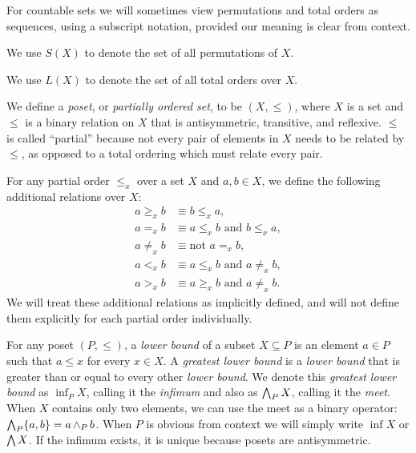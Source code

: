 	For countable sets we will sometimes view permutations and total orders as sequences, using a subscript notation, provided our meaning is clear from context.

	\begin{definition}
		We use $S(X)$ to denote the set of all permutations of $X$.
	\end{definition}

	\begin{definition}
		We use $L(X)$ to denote the set of all total orders over $X$.
	\end{definition}

	\begin{definition}
		We define a \emph{poset}, or \emph{partially ordered set}, to be $(X, \le)$, where $X$ is a set and $\le$ is a binary relation on $X$ that is antisymmetric, transitive, and reflexive. $\le$ is called ``partial'' because not every pair of elements in $X$ needs to be related by $\le$, as opposed to a total ordering which must relate every pair.
	\end{definition}

	\begin{definition}
		For any partial order $\le_x$ over a set $X$ and $a, b \in X$, we define the following additional relations over $X$:
		\begin{align*}
			a \ge_x b &\equiv b \le_x a, \\
			a =_x b &\equiv a \le_x b \text{ and } b \le_x a, \\
			a \ne_x b &\equiv \text{not } a =_x b, \\
			a <_x b &\equiv a \le_x b \text{ and } a \ne_x b, \\
			a >_x b &\equiv a \ge_x b \text{ and } a \ne_x b.
		\end{align*}
		We will treat these additional relations as implicitly defined, and will not define them explicitly for each partial order individually.
	\end{definition}

	\begin{definition}
		For any poset $(P, \le)$, a \emph{lower bound} of a subset $X \subseteq P$ is an element $a \in P$ such that $a \le x$ for every $x \in X$. A \emph{greatest lower bound} is a \emph{lower bound} that is greater than or equal to every other \emph{lower bound}. We denote this \emph{greatest lower bound} as $\inf_P X$, calling it the \emph{infimum} \cite{birkhoﬀ1967lattice} and also as $\operatorname{\bigwedge}_P X$, calling it the \emph{meet}. When $X$ contains only two elements, we can use the meet as a binary operator: $\operatorname{\bigwedge}_P \{a, b\} = a \operatorname{\wedge}_P b$. When $P$ is obvious from context we will simply write $\inf X$ or $\operatorname{\bigwedge} X$. If the infimum exists, it is unique because posets are antisymmetric.
	\end{definition}

